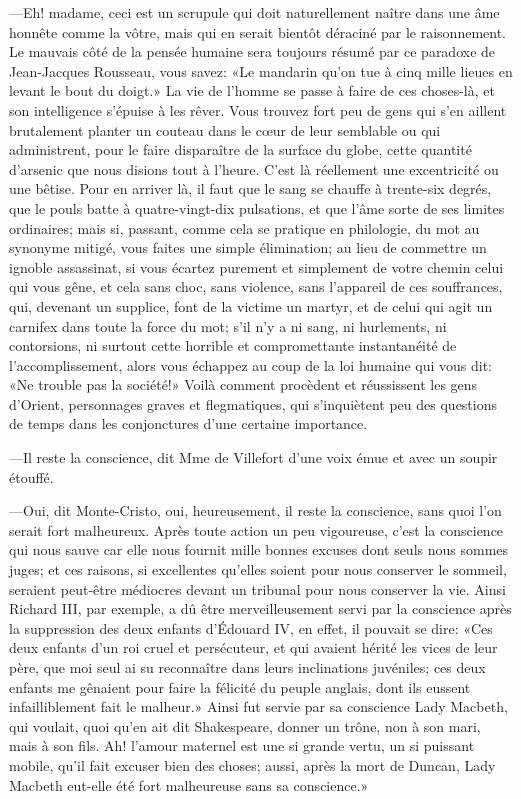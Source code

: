 —Eh! madame, ceci est un scrupule qui doit naturellement naître dans une âme honnête comme la vôtre, mais qui en serait bientôt déraciné par le raisonnement. Le mauvais côté de la pensée humaine sera toujours résumé par ce paradoxe de Jean-Jacques Rousseau, vous savez: «Le mandarin qu'on tue à cinq mille lieues en levant le bout du doigt.» La vie de l'homme se passe à faire de ces choses-là, et son intelligence s'épuise à les rêver. Vous trouvez fort peu de gens qui s'en aillent brutalement planter un couteau dans le cœur de leur semblable ou qui administrent, pour le faire disparaître de la surface du globe, cette quantité d'arsenic que nous disions tout à l'heure. C'est là réellement une excentricité ou une bêtise. Pour en arriver là, il faut que le sang se chauffe à trente-six degrés, que le pouls batte à quatre-vingt-dix pulsations, et que l'âme sorte de ses limites ordinaires; mais si, passant, comme cela se pratique en philologie, du mot au synonyme mitigé, vous faites une simple élimination; au lieu de commettre un ignoble assassinat, si vous écartez purement et simplement de votre chemin celui qui vous gêne, et cela sans choc, sans violence, sans l'appareil de ces souffrances, qui, devenant un supplice, font de la victime un martyr, et de celui qui agit un carnifex dans toute la force du mot; s'il n'y a ni sang, ni hurlements, ni contorsions, ni surtout cette horrible et compromettante instantanéité de l'accomplissement, alors vous échappez au coup de la loi humaine qui vous dit: «Ne trouble pas la société!» Voilà comment procèdent et réussissent les gens d'Orient, personnages graves et flegmatiques, qui s'inquiètent peu des questions de temps dans les conjonctures d'une certaine importance. 

—Il reste la conscience, dit Mme de Villefort d'une voix émue et avec un soupir étouffé. 

—Oui, dit Monte-Cristo, oui, heureusement, il reste la conscience, sans quoi l'on serait fort malheureux. Après toute action un peu vigoureuse, c'est la conscience qui nous sauve car elle nous fournit mille bonnes excuses dont seuls nous sommes juges; et ces raisons, si excellentes qu'elles soient pour nous conserver le sommeil, seraient peut-être médiocres devant un tribunal pour nous conserver la vie. Ainsi Richard III, par exemple, a dû être merveilleusement servi par la conscience après la suppression des deux enfants d'Édouard IV, en effet, il pouvait se dire: «Ces deux enfants d'un roi cruel et persécuteur, et qui avaient hérité les vices de leur père, que moi seul ai su reconnaître dans leurs inclinations juvéniles; ces deux enfants me gênaient pour faire la félicité du peuple anglais, dont ils eussent infailliblement fait le malheur.» Ainsi fut servie par sa conscience Lady Macbeth, qui voulait, quoi qu'en ait dit Shakespeare, donner un trône, non à son mari, mais à son fils. Ah! l'amour maternel est une si grande vertu, un si puissant mobile, qu'il fait excuser bien des choses; aussi, après la mort de Duncan, Lady Macbeth eut-elle été fort malheureuse sans sa conscience.» 

